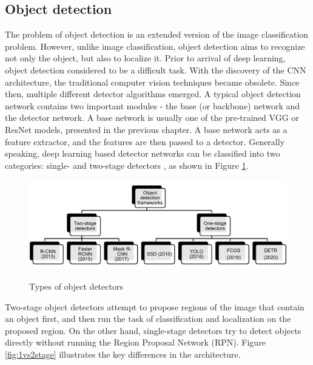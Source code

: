 \documentclass[english, 12pt, a4paper, elec, utf8, a-1b, online]{aaltothesis}
\begin{document}


\subsection{Object detection}
\label{obj_detection_section} 
The problem of object detection is an extended version of the image classification problem. However, unlike image classification, object detection aims to recognize not only the object, but also to localize it. Prior to arrival of deep learning, object detection considered to be a difficult task. With the discovery of the CNN architecture, the traditional computer vision techniques became obsolete. Since then, multiple different detector algorithms emerged. A typical object detection network contains two important modules - the base (or backbone) network  and the detector network. A base network is usually one of the pre-trained VGG or ResNet models, presented in the previous chapter. A base network acts as a feature extractor, and the features are then passed to a detector. Generally speaking, deep learning based detector networks can be classified into two categories: single- and two-stage detectors \cite{Zaidi2021}, as shown in Figure \ref{OD}.  

\begin{figure}[htb]
	\begin{center}
		\includegraphics[width=16cm]{./OD.png}
	\end{center}
	\caption{Types of object detectors}
	\begin{center}
		\label{OD}
	\end{center}
\end{figure}
\FloatBarrier

Two-stage object detectors attempt to propose regions of the image that contain an object first, and then run the task of classification and localization on the proposed region. On the other hand, single-stage detectors try to detect objects directly without running the  Region Proposal Network (RPN). Figure \ref{fig:1vs2stage} illustrates the key differences in the architecture.
\end{document}
